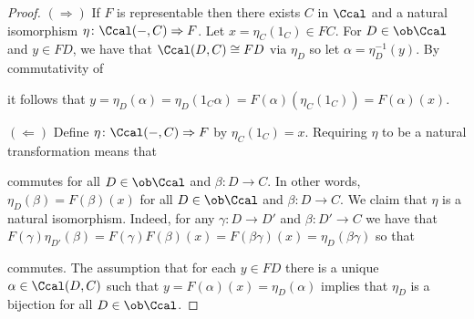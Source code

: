 \begin{solution}
    \begin{proof}
        $(\Rightarrow)$ If $F$ is representable then there exists $C$ in $\Ccal$ and a natural isomorphism $\eta\colon\Ccal(-,C)\Rightarrow F$.
        Let $x=\eta_C(1_C)\in FC$. For $D\in\ob\Ccal$ and $y\in FD$, we have that $\Ccal(D,C)\cong FD$ via $\eta_D$ so let $\alpha=\eta_D^{-1}(y)$.
        By commutativity of
        \begin{center}
        \end{center}
        it follows that $y=\eta_D(\alpha)=\eta_D(1_C\alpha)=F(\alpha)(\eta_C(1_C))=F(\alpha)(x)$.

        $(\Leftarrow)$ Define $\eta\colon\Ccal(-,C)\Rightarrow F$ by $\eta_C(1_C)=x$.
        Requiring $\eta$ to be a natural transformation means that
        \begin{center}
        \end{center}
        commutes for all $D\in\ob\Ccal$ and $\beta\colon D\to C$. In other words, $\eta_D(\beta)=F(\beta)(x)$ for all $D\in\ob\Ccal$ and $\beta\colon D\to C$.
        We claim that $\eta$ is a natural isomorphism. 
        Indeed, for any $\gamma\colon D\to D'$ and $\beta\colon D'\to C$ we have that $F(\gamma)\eta_{D'}(\beta)=F(\gamma)F(\beta)(x)=F(\beta\gamma)(x)=\eta_D(\beta\gamma)$ so that
        \begin{center}
        \end{center}
        commutes. The assumption that for each $y\in FD$ there is a unique $\alpha\in\Ccal(D,C)$ such that $y=F(\alpha)(x)=\eta_D(\alpha)$ implies that $\eta_D$ is a bijection for all $D\in\ob\Ccal$.
    \end{proof}
\end{solution}

